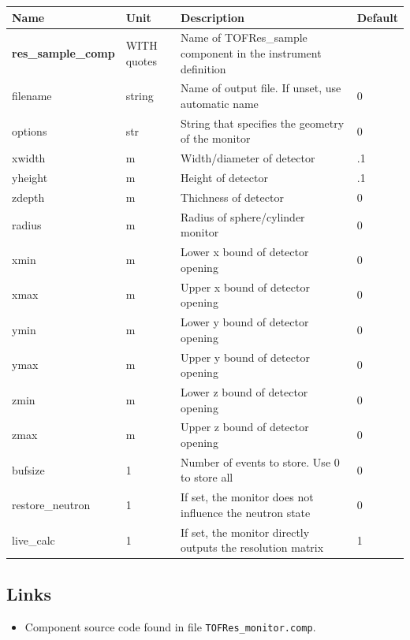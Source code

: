 \begin{longtable}{p{}p{}p{}p{}}
\toprule
\textbf{Name} & \textbf{Unit} & \textbf{Description} & \textbf{Default} \\
\midrule
\endhead
\textbf{res\_sample\_comp} & WITH quotes & Name of TOFRes\_sample component in the instrument definition &  \\
filename & string & Name of output file. If unset, use automatic name & 0 \\
options & str & String that specifies the geometry of the monitor & 0 \\
xwidth & m & Width/diameter of detector & .1 \\
yheight & m & Height of detector & .1 \\
zdepth & m & Thichness of detector & 0 \\
radius & m & Radius of sphere/cylinder monitor & 0 \\
xmin & m & Lower x bound of detector opening & 0 \\
xmax & m & Upper x bound of detector opening & 0 \\
ymin & m & Lower y bound of detector opening & 0 \\
ymax & m & Upper y bound of detector opening & 0 \\
zmin & m & Lower z bound of detector opening & 0 \\
zmax & m & Upper z bound of detector opening & 0 \\
bufsize & 1 & Number of events to store. Use 0 to store all & 0 \\
restore\_neutron & 1 & If set, the monitor does not influence the neutron state & 0 \\
live\_calc & 1 & If set, the monitor directly outputs the resolution matrix & 1 \\
\bottomrule
\end{longtable}

\subsection*{Links}
\begin{itemize}
  \item Component source code found in file \texttt{TOFRes\_monitor.comp}.
\end{itemize}
